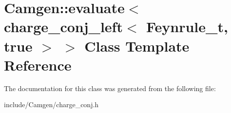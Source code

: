 \hypertarget{a00146}{\section{Camgen\-:\-:evaluate$<$ charge\-\_\-conj\-\_\-left$<$ Feynrule\-\_\-t, true $>$ $>$ Class Template Reference}
\label{a00146}
}


The documentation for this class was generated from the following file\-:\begin{DoxyCompactItemize}
\item 
include/\-Camgen/charge\-\_\-conj.\-h\end{DoxyCompactItemize}
